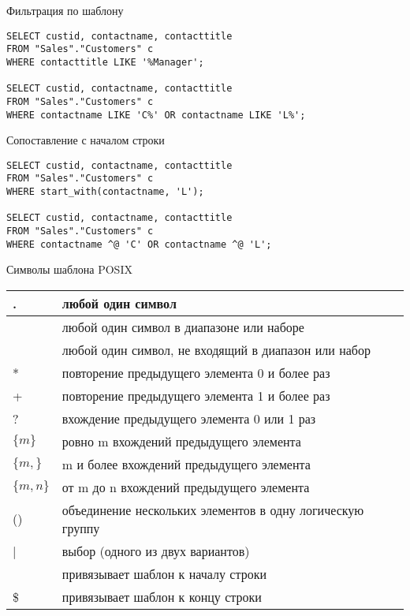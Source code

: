 \documentclass[12pt]{article}
\begin{document}
\begin{Example}{Фильтрация по шаблону}
\begin{lstlisting}
SELECT custid, contactname, contacttitle
FROM "Sales"."Customers" c
WHERE contacttitle LIKE '%Manager';

SELECT custid, contactname, contacttitle
FROM "Sales"."Customers" c
WHERE contactname LIKE 'C%' OR contactname LIKE 'L%';
\end{lstlisting}
\end{Example}

\begin{Example}{Сопоставление с началом строки}
\begin{lstlisting}
SELECT custid, contactname, contacttitle
FROM "Sales"."Customers" c
WHERE start_with(contactname, 'L');

SELECT custid, contactname, contacttitle
FROM "Sales"."Customers" c
WHERE contactname ^@ 'C' OR contactname ^@ 'L';
\end{lstlisting}
\end{Example}

\begin{nota}{Символы шаблона POSIX}
    \begin{center}
        \begin{tabular}{|m{3em}|m{30em}|}
            \hline
            . & любой один символ \\ 
            \hline
            [...] & любой один символ в диапазоне или наборе \\
            \hline
            [\^\ ...] & любой один символ, не входящий в диапазон или набор \\
            \hline
            * & повторение предыдущего элемента 0 и более раз \\
            \hline
            + & повторение предыдущего элемента 1 и более раз \\
            \hline
            ? & вхождение предыдущего элемента 0 или 1 раз \\
            \hline
            $\{m\}$ & ровно m вхождений предыдущего элемента \\
            \hline
            $\{m,\}$ & m и более вхождений предыдущего элемента \\
            \hline
            $\{m,n\}$ & от m до n вхождений предыдущего элемента \\
            \hline
            () & объединение нескольких элементов в одну логическую группу \\
            \hline
            | & выбор (одного из двух вариантов) \\
            \hline
             & привязывает шаблон к началу строки \\
            \hline
            \$ & привязывает шаблон к концу строки \\
            \hline
        \end{tabular}
    \end{center}
\end{nota}
\end{document}
